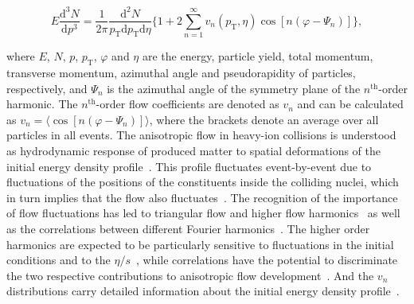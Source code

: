 \documentclass[ALICE,manyauthors]{cernphprep}
\begin{document}
\begin{equation}
E\frac{\mathrm{d}^3N}{\mathrm{d}p^3} = \frac{1}{2\pi}\frac{\mathrm{d}^2N}{p_{\mathrm{T}}\mathrm{d}p_{\mathrm{T}}\mathrm{d}\eta} \Big\{1 + 2\sum_{n=1}^{\infty} v_n(p_{\mathrm{T}},\eta) \cos[n(\varphi - \Psi_n)]\Big\},
\label{Eq:Fourier}
\end{equation}

\noindent where $E$, $N$, $p$, $p_{\mathrm{T}}$, $\varphi$ and $\eta$ are the energy, particle yield, total momentum, transverse momentum, azimuthal angle and pseudorapidity of particles, respectively, and $\Psi_n$ is the azimuthal angle of the symmetry plane of the $n^{\mathrm{th}}$-order harmonic. The $n^{\mathrm{th}}$-order flow coefficients are denoted as $v_n$ and can be calculated as $v_{n} = \langle{\cos[n(\varphi - \Psi_n)]}\rangle$, where the brackets denote an average over all particles in all events.
The anisotropic flow in heavy-ion collisions is understood as hydrodynamic response of produced matter to spatial deformations of the initial energy density profile~\cite{Floerchinger:2013tya}.
This profile fluctuates event-by-event due to fluctuations of the positions of the constituents inside the colliding nuclei, which in turn implies that the flow also fluctuates~\cite{Miller:2003kd,Alver:2006wh}.
The recognition of the importance of flow fluctuations has led to triangular flow and higher flow harmonics~\cite{Alver:2010gr,ALICE:2011ab} as well as the correlations between different Fourier harmonics~\cite{Niemi:2012aj,Aad:2014fla}.
The higher order harmonics are expected to be particularly sensitive to fluctuations in the initial conditions and to the $\eta/s$~\cite{Alver:2010dn,Luzum:2012wu}, while correlations have the potential to discriminate the two respective contributions to anisotropic flow development~\cite{Niemi:2012aj}.
And the $v_{n}$ distributions carry detailed information about the initial energy density profile~\cite{Renk:2014jja,Yan:2014nsa}.
\end{document}
